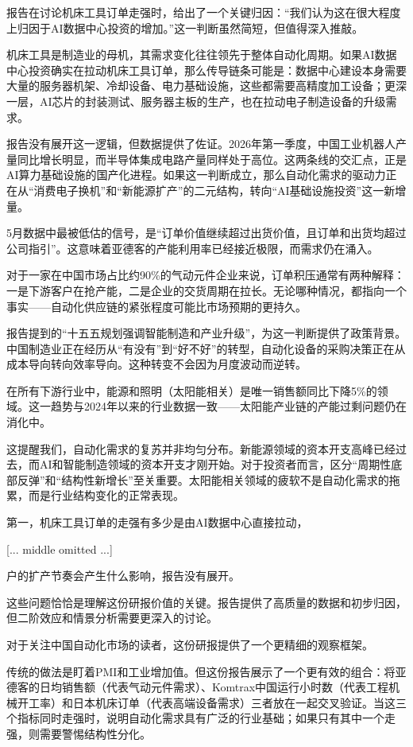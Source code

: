 \documentclass[11pt]{ctexart}
\begin{document}
报告在讨论机床工具订单走强时，给出了一个关键归因：“我们认为这在很大程度上归因于AI数据中心投资的增加。”这一判断虽然简短，但值得深入推敲。

机床工具是制造业的母机，其需求变化往往领先于整体自动化周期。如果AI数据中心投资确实在拉动机床工具订单，那么传导链条可能是：数据中心建设本身需要大量的服务器机架、冷却设备、电力基础设施，这些都需要高精度加工设备；更深一层，AI芯片的封装测试、服务器主板的生产，也在拉动电子制造设备的升级需求。

报告没有展开这一逻辑，但数据提供了佐证。2026年第一季度，中国工业机器人产量同比增长明显，而半导体集成电路产量同样处于高位。这两条线的交汇点，正是AI算力基础设施的国产化进程。如果这一判断成立，那么自动化需求的驱动力正在从“消费电子换机”和“新能源扩产”的二元结构，转向“AI基础设施投资”这一新增量。

5月数据中最被低估的信号，是“订单价值继续超过出货价值，且订单和出货均超过公司指引”。这意味着亚德客的产能利用率已经接近极限，而需求仍在涌入。

对于一家在中国市场占比约90\%的气动元件企业来说，订单积压通常有两种解释：一是下游客户在抢产能，二是企业的交货周期在拉长。无论哪种情况，都指向一个事实——自动化供应链的紧张程度可能比市场预期的更持久。

报告提到的“十五五规划强调智能制造和产业升级”，为这一判断提供了政策背景。中国制造业正在经历从“有没有”到“好不好”的转型，自动化设备的采购决策正在从成本导向转向效率导向。这种转变不会因为月度波动而逆转。

在所有下游行业中，能源和照明（太阳能相关）是唯一销售额同比下降5\%的领域。这一趋势与2024年以来的行业数据一致——太阳能产业链的产能过剩问题仍在消化中。

这提醒我们，自动化需求的复苏并非均匀分布。新能源领域的资本开支高峰已经过去，而AI和智能制造领域的资本开支才刚开始。对于投资者而言，区分“周期性底部反弹”和“结构性新增长”至关重要。太阳能相关领域的疲软不是自动化需求的拖累，而是行业结构变化的正常表现。

第一，机床工具订单的走强有多少是由AI数据中心直接拉动，

[... middle omitted ...]

户的扩产节奏会产生什么影响，报告没有展开。

这些问题恰恰是理解这份研报价值的关键。报告提供了高质量的数据和初步归因，但二阶效应和情景分析需要更深入的讨论。

对于关注中国自动化市场的读者，这份研报提供了一个更精细的观察框架。

传统的做法是盯着PMI和工业增加值。但这份报告展示了一个更有效的组合：将亚德客的日均销售额（代表气动元件需求）、Komtrax中国运行小时数（代表工程机械开工率）和日本机床订单（代表高端设备需求）三者放在一起交叉验证。当这三个指标同时走强时，说明自动化需求具有广泛的行业基础；如果只有其中一个走强，则需要警惕结构性分化。
\end{document}
